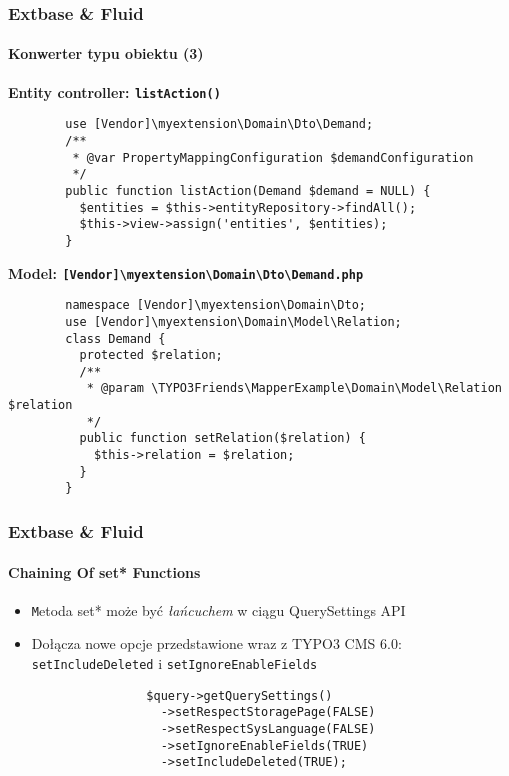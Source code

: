 \begin{frame}[fragile]
	\frametitle{Extbase \& Fluid}
	\framesubtitle{Konwerter typu obiektu (3)}

	\lstset{
		basicstyle=\tiny\ttfamily
	}

	\smaller\textbf{Entity controller: \texttt{listAction()}}\normalsize
	\begin{lstlisting}
		use [Vendor]\myextension\Domain\Dto\Demand;
		/**
		 * @var PropertyMappingConfiguration $demandConfiguration
		 */
		public function listAction(Demand $demand = NULL) {
		  $entities = $this->entityRepository->findAll();
		  $this->view->assign('entities', $entities);
		}
	\end{lstlisting}

	\smaller\textbf{Model: \texttt{[Vendor]\textbackslash myextension\textbackslash Domain\textbackslash Dto\textbackslash Demand.php}}\normalsize
	\begin{lstlisting}
		namespace [Vendor]\myextension\Domain\Dto;
		use [Vendor]\myextension\Domain\Model\Relation;
		class Demand {
		  protected $relation;
		  /**
		   * @param \TYPO3Friends\MapperExample\Domain\Model\Relation $relation
		   */
		  public function setRelation($relation) {
		    $this->relation = $relation;
		  }
		}
	\end{lstlisting}

\end{frame}


\begin{frame}[fragile]
	\frametitle{Extbase \& Fluid}
	\framesubtitle{Chaining Of set* Functions}

	\lstset{
		basicstyle=\tiny\ttfamily
	}

	\begin{itemize}
		\item \texttt Metoda {set*} może być \emph{łańcuchem} w ciągu QuerySettings API
		\item Dołącza nowe opcje przedstawione wraz z TYPO3 CMS 6.0:\newline
			\texttt{setIncludeDeleted} i \texttt{setIgnoreEnableFields}

			\begin{lstlisting}
				$query->getQuerySettings()
				  ->setRespectStoragePage(FALSE)
				  ->setRespectSysLanguage(FALSE)
				  ->setIgnoreEnableFields(TRUE)
				  ->setIncludeDeleted(TRUE);
			\end{lstlisting}
	\end{itemize}

\end{frame}

